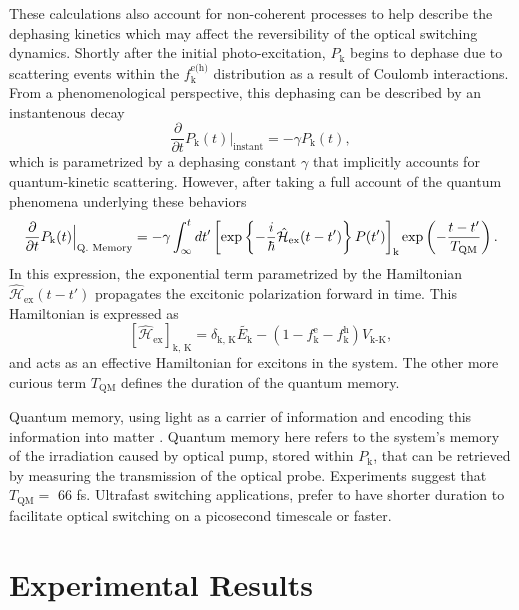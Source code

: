 These calculations also account for non-coherent processes to help describe the dephasing kinetics which may affect the reversibility of the optical switching dynamics. Shortly after the initial photo-excitation, $P_\text{k}$ begins to dephase due to scattering events within the $f_\text{k}^\text{e(h)}$ distribution as a result of Coulomb interactions. From a phenomenological perspective, this dephasing can be described by an instantenous decay
\begin{equation}
	\dfrac{\partial}{\partial t} P_\text{k}(t) \Big|_\text{instant} = -\gamma P_\text{k}(t),
\end{equation}
which is parametrized by a dephasing constant $\gamma$ that implicitly accounts for quantum-kinetic scattering. However, after taking a full account of the quantum phenomena underlying these behaviors
%
\begin{equation}\label{eq:kira_phenom_dephase}
	\dfrac{\partial}{\partial t} P_\text{k}(t) \Big|_\text{Q. Memory} = -\gamma \int^{t}_{\infty} dt' \left[ \exp\left\{ - \frac{\small i}{ \small \hbar} \hat{\mathcal{H}}_\text{ex}(t-t') \right\} P(t') \right]_\text{k} \exp \left(- \frac{t-t'}{T_\text{QM}} \right).
\end{equation}
%
In this expression, the exponential term parametrized by the Hamiltonian $\hat{\mathcal{H}}_\text{ex}(t-t')$ propagates the excitonic polarization forward in time. This Hamiltonian is expressed as
\begin{equation}\label{eq:kira_quantum_dephase}
	\left[ \hat{\mathcal{H}}_\text{ex} \right]_\text{k, K}= \delta_\text{k, K} \tilde{E_\text{k}} - (1 - f_\text{k}^\text{e} - f_\text{k}^\text{h}) V_\text{k-K},
\end{equation}
%
and acts as an effective Hamiltonian for excitons in the system. The other more curious term $T_\text{QM}$ defines the duration of the quantum memory.

Quantum memory, using light as a carrier of information and encoding this information into matter \cite{iakoupov2013efficient}. Quantum memory here refers to the system's memory of the irradiation caused by optical pump, stored within $P_\text{k}$, that can be retrieved by measuring the transmission of the optical probe. Experiments suggest that $T_\text{QM} = $ 66 fs. Ultrafast switching applications, prefer to have shorter duration to facilitate optical switching on a picosecond timescale or faster.

\section{Experimental Results}

